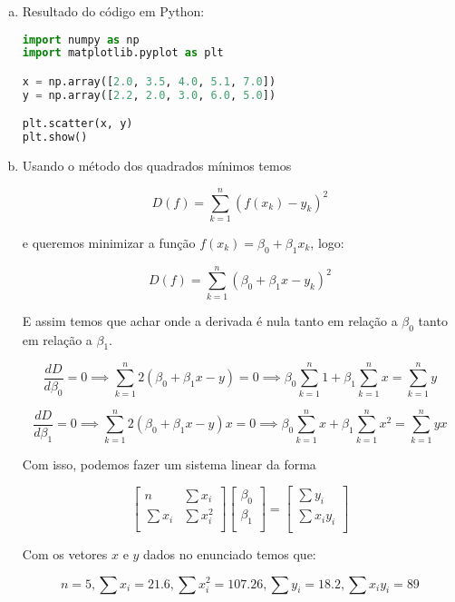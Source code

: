 \documentclass[11pt]{article}
\begin{document}
\begin{exerc}
\begin{enumerate}[a.]
\
\item
Resultado do código em Python:
\begin{lstlisting}[language=Python]
import numpy as np
import matplotlib.pyplot as plt

x = np.array([2.0, 3.5, 4.0, 5.1, 7.0])
y = np.array([2.2, 2.0, 3.0, 6.0, 5.0])

plt.scatter(x, y)
plt.show()
\end{lstlisting}

\item
Usando o método dos quadrados mínimos temos

$$D(f) = \sum_{k=1}^{n}(f(x_k) - y_k)^2$$

e queremos minimizar a função $f(x_k) = \beta_0 + \beta_1 x_k$, logo:

$$D(f) = \sum_{k=1}^{n}(\beta_0 + \beta_1 x - y_k)^2$$

E assim temos que achar onde a derivada é nula tanto em relação a $\beta_0$ tanto em relação a $\beta_1$.

$$\frac{dD}{d\beta_0} = 0 \implies \sum_{k=1}^{n} 2(\beta_0 + \beta_1 x - y) = 0 \implies \beta_0 \sum_{k=1}^{n} 1 + \beta_1 \sum_{k=1}^{n} x = \sum_{k=1}^{n} y$$

$$\frac{dD}{d\beta_1} = 0 \implies \sum_{k=1}^{n} 2(\beta_0 + \beta_1 x - y) x = 0 \implies \beta_0 \sum_{k=1}^{n} x + \beta_1 \sum_{k=1}^{n} x^2 = \sum_{k=1}^{n} yx$$

Com isso, podemos fazer um sistema linear da forma

$$
\begin{bmatrix}
	n & \sum x_i\\
	\sum x_i & \sum x_i^2\\
\end{bmatrix}
\begin{bmatrix}
	\beta_0\\
	\beta_1\\
\end{bmatrix}
=
\begin{bmatrix}
	\sum y_i\\
	\sum x_i y_i\\
\end{bmatrix}
$$

Com os vetores $x$ e $y$ dados no enunciado temos que:

$$n = 5, \sum x_i = 21.6, \sum x_i^2 = 107.26, \sum y_i = 18.2, \sum x_i y_i = 89$$


\end{enumerate}
\end{exerc}
\end{document}
